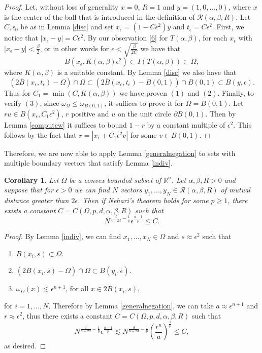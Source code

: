 \documentclass[footinclude=true]{amsart}
\theoremstyle{plain}
\newtheorem{cor}[theo]{Corollary}
\begin{document}
	\begin{proof}
		Let, without loss of generality $x=0$, $R=1$ and $y=(1,0,...,0)$, where $x$ is the center of the ball that is introduced in the definition of $\mathscr{R}(\alpha,\beta,R)$. Let $C,\epsilon_{0}$ be as in Lemma \ref{disc} and set $x_{\epsilon}=(1-C\epsilon^{2})y$ and $t_{\epsilon}=C\epsilon^{2}$. First, we notice that $|x_{\epsilon}-y|= C\epsilon^{2}$.
		By our observation \eqref{6} for $T(\alpha,\beta)$, for each $x_{\epsilon}$ with $|x_{\epsilon}-y|<\frac{\beta}{2}$, or in other words for $ \epsilon<\sqrt{\frac{\beta}{2C}}$ we have that 
		$$B(x_{\epsilon},K(\alpha,\beta)\epsilon^{2})\subset I(T(\alpha,\beta))\subset \Omega,$$ where $K(\alpha,\beta)$ is a suitable constant.  By Lemma \ref{disc} we also have that
		$$(2\overline{B}(x_{\epsilon},t_{\epsilon})-\Omega)\cap\Omega\subset (2\overline{B}(x_{\epsilon},t_{\epsilon})-B(0,1))\cap B(0,1)\subset B(y,\epsilon).$$ Thus for $C_1=\min(C,K(\alpha,\beta))$ we have proven $(1)$ and $(2)$. Finally, to verify $(3)$, since $\omega_{\Omega}\leq \omega_{B(0,1)}$, it suffices to prove it for $\Omega=B(0,1)$. Let $ru\in B(x_{\epsilon},C_1\epsilon^2)$, $r$ positive and $u$ on the unit circle $\partial B(0,1)$.
		Then by Lemma \ref{computew} it suffices to bound $1-r$ by a constant multiple of $\epsilon^{2}$. This follows by the fact that $r=|x_{\epsilon}+C_1\epsilon^2v|$ for some $v\in B(0,1)$. 
	\end{proof}
	Therefore, we are now able to apply Lemma \ref{generalnegation} to sets with multiple boundary vectors that satisfy Lemma \ref{indiv}.
	\begin{cor}\label{cor 1}
		Let $\Omega$ be a convex bounded subset of $\mathbb{R}^{n}$. Let $\alpha,\beta,R>0$ and suppose that for $\epsilon>0$ we can find $N$ vectors $y_{1},...,y_{N}\in\mathscr{R}(\alpha,\beta,R)$ of mutual distance greater than $2\epsilon$. Then if Nehari's theorem holds for some $p\geq 1$, there exists a constant $C=C(\Omega,p,d,\alpha,\beta,R)$ such that 
		$$N^{\frac{d}{n+2d}-\frac{1}{p}}\epsilon^{\frac{n-1}{p}}\leq C.$$
	\end{cor}
	\begin{proof}
		By Lemma \ref{indiv}, we can find $x_{1},...,x_{N}\in \Omega$ and $s\approx \epsilon^{2}$ such that 
		\begin{enumerate}
			\item $B(x_{i},s)\subset \Omega$.
			\item $(2\overline{B}(x_{i},s)-\Omega)\cap\Omega\subset B(y_{i},\epsilon)$.
			\item $\omega_{\Omega}(x)\lesssim \epsilon^{n+1}$, for all $x\in 2B(x_{i},s)$,
		\end{enumerate}
		for $i=1,...,N$. Therefore by Lemma \ref{generalnegation}, we can take $a\approx\epsilon^{n+1}$ and $r\approx \epsilon^{2}$, thus there exists a constant $C=C(\Omega,p,d,\alpha,\beta,R)$ such that 
		$$ N^{\frac{d}{n+2d}-\frac{1}{p}}\epsilon^{\frac{n-1}{p}}\lesssim N^{\frac{d}{n+2d}-\frac{1}{p}}(\dfrac{r^{n}}{a})^{\frac{1}{p}}\leq C,$$ as desired.
	\end{proof}
\end{document}
